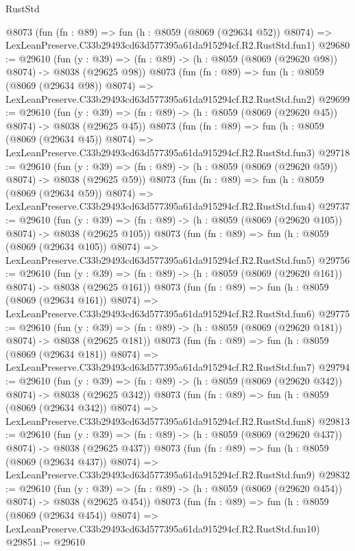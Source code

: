 \begin{lexlean}{RustStd}
\begin{coremodule}
    @8073
    (fun (fn : @89) =>
    fun (h : @8059 (@8069 (@29634 @52)) @8074) =>
    LexLeanPreserve.C33b29493cd63d577395a61da915294cf.R2.RustStd.fun1)
@29680 := @29610
    (fun (y : @39) => (fn : @89) -> (h : @8059 (@8069 (@29620 @98)) @8074) -> @8038 (@29625 @98))
    @8073
    (fun (fn : @89) =>
    fun (h : @8059 (@8069 (@29634 @98)) @8074) =>
    LexLeanPreserve.C33b29493cd63d577395a61da915294cf.R2.RustStd.fun2)
@29699 := @29610
    (fun (y : @39) => (fn : @89) -> (h : @8059 (@8069 (@29620 @45)) @8074) -> @8038 (@29625 @45))
    @8073
    (fun (fn : @89) =>
    fun (h : @8059 (@8069 (@29634 @45)) @8074) =>
    LexLeanPreserve.C33b29493cd63d577395a61da915294cf.R2.RustStd.fun3)
@29718 := @29610
    (fun (y : @39) => (fn : @89) -> (h : @8059 (@8069 (@29620 @59)) @8074) -> @8038 (@29625 @59))
    @8073
    (fun (fn : @89) =>
    fun (h : @8059 (@8069 (@29634 @59)) @8074) =>
    LexLeanPreserve.C33b29493cd63d577395a61da915294cf.R2.RustStd.fun4)
@29737 := @29610
    (fun (y : @39) => (fn : @89) -> (h : @8059 (@8069 (@29620 @105)) @8074) -> @8038 (@29625 @105))
    @8073
    (fun (fn : @89) =>
    fun (h : @8059 (@8069 (@29634 @105)) @8074) =>
    LexLeanPreserve.C33b29493cd63d577395a61da915294cf.R2.RustStd.fun5)
@29756 := @29610
    (fun (y : @39) => (fn : @89) -> (h : @8059 (@8069 (@29620 @161)) @8074) -> @8038 (@29625 @161))
    @8073
    (fun (fn : @89) =>
    fun (h : @8059 (@8069 (@29634 @161)) @8074) =>
    LexLeanPreserve.C33b29493cd63d577395a61da915294cf.R2.RustStd.fun6)
@29775 := @29610
    (fun (y : @39) => (fn : @89) -> (h : @8059 (@8069 (@29620 @181)) @8074) -> @8038 (@29625 @181))
    @8073
    (fun (fn : @89) =>
    fun (h : @8059 (@8069 (@29634 @181)) @8074) =>
    LexLeanPreserve.C33b29493cd63d577395a61da915294cf.R2.RustStd.fun7)
@29794 := @29610
    (fun (y : @39) => (fn : @89) -> (h : @8059 (@8069 (@29620 @342)) @8074) -> @8038 (@29625 @342))
    @8073
    (fun (fn : @89) =>
    fun (h : @8059 (@8069 (@29634 @342)) @8074) =>
    LexLeanPreserve.C33b29493cd63d577395a61da915294cf.R2.RustStd.fun8)
@29813 := @29610
    (fun (y : @39) => (fn : @89) -> (h : @8059 (@8069 (@29620 @437)) @8074) -> @8038 (@29625 @437))
    @8073
    (fun (fn : @89) =>
    fun (h : @8059 (@8069 (@29634 @437)) @8074) =>
    LexLeanPreserve.C33b29493cd63d577395a61da915294cf.R2.RustStd.fun9)
@29832 := @29610
    (fun (y : @39) => (fn : @89) -> (h : @8059 (@8069 (@29620 @454)) @8074) -> @8038 (@29625 @454))
    @8073
    (fun (fn : @89) =>
    fun (h : @8059 (@8069 (@29634 @454)) @8074) =>
    LexLeanPreserve.C33b29493cd63d577395a61da915294cf.R2.RustStd.fun10)
@29851 := @29610

\end{coremodule}
\end{lexlean}

